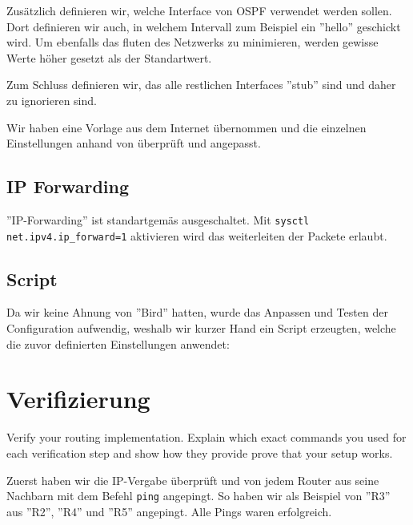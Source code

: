 \documentclass[11pt,titlepage]{article}
\newenvironment{shadedquotation}
 {\begin{shaded*}
  \quoting[leftmargin=0pt, vskip=0pt]
 }
 {\endquoting
 \end{shaded*}
}
\begin{document}
Zusätzlich definieren wir, welche Interface von OSPF verwendet werden sollen. Dort definieren wir auch, in welchem Intervall zum Beispiel ein ''hello'' geschickt wird.
Um ebenfalls das fluten des Netzwerks zu minimieren, werden gewisse Werte höher gesetzt als der Standartwert.

Zum Schluss definieren wir, das alle restlichen Interfaces ''stub'' sind und daher zu ignorieren sind.

\medskip
Wir haben eine Vorlage aus dem Internet übernommen \cite{BIRD_EXAMPLE} und die einzelnen Einstellungen anhand von \cite{BIRD_DOC} überprüft und angepasst.

\subsection{IP Forwarding}
\label{subsec:IPForwarding}

''IP-Forwarding'' ist standartgemäs ausgeschaltet. Mit \lstinline!sysctl net.ipv4.ip_forward=1! aktivieren wird das weiterleiten der Packete erlaubt.

\par\medskip

\subsection{Script}
\label{subsec:Script}

Da wir keine Ahnung von ''Bird'' hatten, wurde das Anpassen und Testen der Configuration aufwendig, weshalb wir kurzer Hand ein Script erzeugten, welche die zuvor definierten Einstellungen anwendet:



\section{Verifizierung}
\label{sec:Verifizierung}
\begin{shadedquotation}
  Verify your routing implementation. Explain which exact commands you used for each verification step and show how they provide prove that your setup works.
\end{shadedquotation}
Zuerst haben wir die IP-Vergabe überprüft und von jedem Router aus seine Nachbarn mit dem Befehl \lstinline!ping! angepingt. So haben wir als Beispiel von ''R3'' aus ''R2'', ''R4'' und ''R5'' angepingt.
Alle Pings waren erfolgreich.

\medskip
\end{document}
